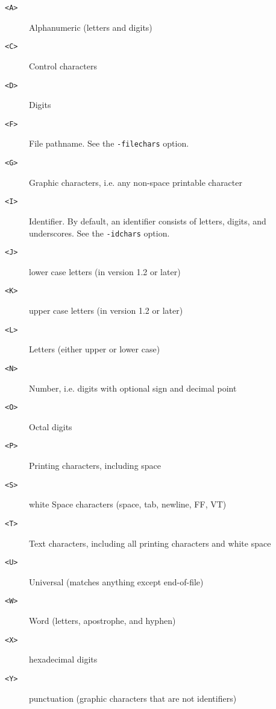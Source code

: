 \begin{description}
\item[{\tt <A>}]
Alphanumeric (letters and digits)
\item[{\tt <C>}]
Control characters
\item[{\tt <D>}]
Digits
\item[{\tt <F>}]
File pathname.  See the \verb/-filechars/ option.
\item[{\tt <G>}]
Graphic characters, i.e. any non-space printable character
\item[{\tt <I>}]
Identifier.  By default, an identifier consists of letters, digits, and
underscores.  See the \verb/-idchars/ option.
\item[{\tt <J>}]
lower case letters (in version 1.2 or later)
\item[{\tt <K>}]
upper case letters (in version 1.2 or later)
\item[{\tt <L>}]
Letters (either upper or lower case)
\item[{\tt <N>}]
Number, i.e. digits with optional sign and decimal point
\item[{\tt <O>}]
Octal digits
\item[{\tt <P>}]
Printing characters, including space
\item[{\tt <S>}]
white Space characters (space, tab, newline, FF, VT)
\item[{\tt <T>}]
Text characters, including all printing characters and white space
\item[{\tt <U>}]
Universal (matches anything except end-of-file)
\item[{\tt <W>}]
Word (letters, apostrophe, and hyphen)
\item[{\tt <X>}]
hexadecimal digits
\item[{\tt <Y>}]
punctuation (graphic characters that are not identifiers)
\end{description}
